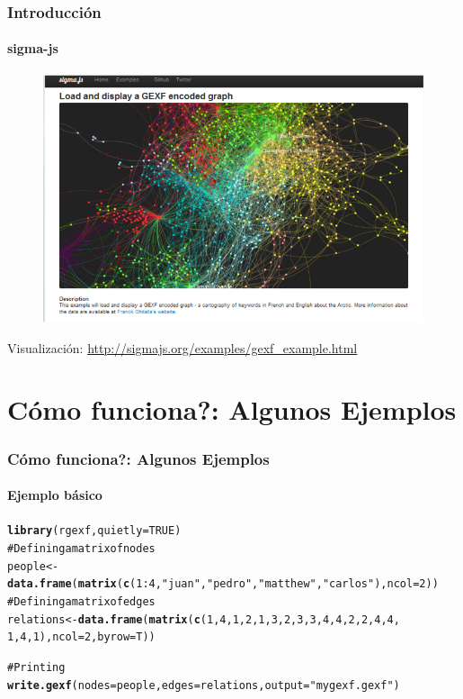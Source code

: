 \documentclass{beamer}\usepackage{graphicx, color}
\makeatletter
\newcommand{\hlfunctioncall}[1]{\textcolor[rgb]{0.501960784313725,0,0.329411764705882}{\textbf{#1}}}%
\newcommand{\hlstring}[1]{\textcolor[rgb]{0.6,0.6,1}{#1}}%
\newcommand{\hlcomment}[1]{\textcolor[rgb]{0.180392156862745,0.6,0.341176470588235}{#1}}%
\newenvironment{kframe}{%
 \def\at@end@of@kframe{}%
 \ifinner\ifhmode%
  \def\at@end@of@kframe{\end{minipage}}%
  \begin{minipage}{\columnwidth}%
 \fi\fi%
 \def\FrameCommand##1{\hskip\@totalleftmargin \hskip-\fboxsep
 \colorbox{shadecolor}{##1}\hskip-\fboxsep
     \hskip-\linewidth \hskip-\@totalleftmargin \hskip\columnwidth}%
 \MakeFramed {\advance\hsize-\width
   \@totalleftmargin\z@ \linewidth\hsize
   \@setminipage}}%
 {\par\unskip\endMakeFramed%
 \at@end@of@kframe}
\newenvironment{knitrout}{}{} %
\makeatother
\begin{document}
\begin{frame}
\frametitle{Introducci\'on}
\framesubtitle{sigma-js}
\begin{figure}
\centering
\includegraphics[width=.8\linewidth]{sigmajs}
\end{figure}

Visualizaci\'on: \url{http://sigmajs.org/examples/gexf_example.html}
\end{frame}

\section{C\'omo funciona?: Algunos Ejemplos}


\begin{frame}[fragile]
\frametitle{C\'omo funciona?: Algunos Ejemplos}
\framesubtitle{Ejemplo b\'asico}
\begin{knitrout}\footnotesize
{}\color{fgcolor}\begin{kframe}
\begin{alltt}
\hlfunctioncall{library}(rgexf, quietly = TRUE)
\hlcomment{# Defining a matrix of nodes}
people <- \hlfunctioncall{data.frame}(\hlfunctioncall{matrix}(\hlfunctioncall{c}(1:4, \hlstring{"juan"}, \hlstring{"pedro"}, \hlstring{"matthew"}, \hlstring{"carlos"}), ncol = 2))
\hlcomment{# Defining a matrix of edges}
relations <- \hlfunctioncall{data.frame}(\hlfunctioncall{matrix}(\hlfunctioncall{c}(1, 4, 1, 2, 1, 3, 2, 3, 3, 4, 4, 2, 2, 4, 4, 
    1, 4, 1), ncol = 2, byrow = T))

\hlcomment{# Printing}
\hlfunctioncall{write.gexf}(nodes = people, edges = relations, output = \hlstring{"mygexf.gexf"})
\end{alltt}


{\ttfamily\noindent\itshape\color{messagecolor}{\#\# GEXF graph successfully written at:\\\#\# /home/george/Documents/userrchile/presentaciones/20130615\_paquetes\_en\_\_r/mygexf.gexf}}\end{kframe}
\end{knitrout}

\end{frame}
\end{document}
